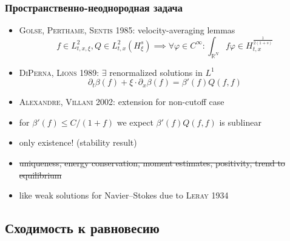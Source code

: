 \documentclass[mathserif]{beamer} %
\newcommand{\pder}[2][]{\partial_{#2}{#1}}
\newcommand{\Cite}[2][]{\alert{\textsc{#2 #1}}}
\begin{document}
\begin{frame}
    \frametitle{Пространственно-неоднородная задача}
    \begin{itemize}
        \item \Cite[1985]{Golse, Perthame, Sentis}: velocity-averaging lemmas\!\!\!\!\!\!
        \[ f\in L^2_{t,x,\xi}, Q\in L^2_{t,x}(H_\xi^s) \implies
        \forall\varphi\in C^\infty: \int_{\mathbb{R}^N} f\varphi\in H_{t,x}^{\frac1{2(1+s)}} \]
        \item \Cite[1989]{DiPerna, Lions}: \(\exists\) renormalized solutions in \(L^1\)
        \[ \pder[\beta(f)]{t} + \xi\cdot\pder[\beta(f)]{x} = \beta'(f)Q(f,f) \]
        \item \Cite[2002]{Alexandre, Villani}: extension for non-cutoff case
    \end{itemize}
    \begin{itemize}
        \item for \(\beta'(f) \leq C/(1+f)\) we expect \(\beta'(f)Q(f,f)\) is sublinear
        \item only existence! (stability result)
        \item \sout{uniqueness, energy conservation, moment estimates, positivity, trend to equilibrium}
        \item like weak solutions for Navier--Stokes due to \Cite[1934]{Leray}
    \end{itemize}
\end{frame}

\subsection{Сходимость к равновесию}
\end{document}

